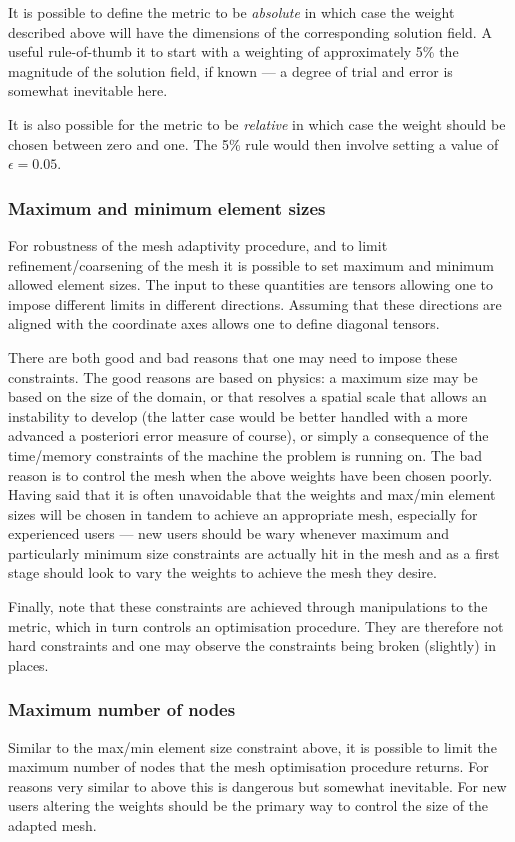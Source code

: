 It is possible to define the metric to be \emph{absolute} in which case the
weight described above will have the dimensions of the corresponding solution 
field. A useful rule-of-thumb it to start with a weighting of approximately 5\%
the magnitude of the solution field, if known --- a degree of trial and error
is somewhat inevitable here.

It is also possible for the metric to be \emph{relative} in which case the
weight should be chosen between zero and one. The 5\% rule would then involve
setting a value of $\epsilon=0.05$.

\subsubsection{Maximum and minimum element sizes}
For robustness of the mesh adaptivity procedure, and to limit refinement/coarsening of the
mesh it is possible to set maximum and minimum allowed element sizes. The input to
these quantities are tensors allowing one to impose different limits in different directions.
Assuming that these directions are aligned with the coordinate axes allows one to define
diagonal tensors.

There are both good and bad reasons that one may need to impose these constraints. The good
reasons are based on physics: a maximum size may be based on the size of the domain, or that
resolves a spatial scale that allows an instability to develop (the latter case would be better
handled with a more advanced a posteriori error measure of course), or simply a consequence of
the time/memory constraints of the machine the problem is running on. The bad reason is to control
the mesh when the above weights have been chosen poorly. Having said that it is often 
unavoidable that the weights and max/min element sizes will be chosen in tandem to achieve 
an appropriate mesh, especially for experienced users --- new users should be wary whenever maximum
and particularly minimum size constraints are actually hit in the mesh and as a first stage should
look to vary the weights to achieve the mesh they desire.

Finally, note that these constraints are achieved through manipulations to the metric, which in turn
controls an optimisation procedure. They are therefore not hard constraints and one may observe the
constraints being broken (slightly) in places.

\subsubsection{Maximum number of nodes}
Similar to the max/min element size constraint above, it is possible to limit the maximum number of nodes
that the mesh optimisation procedure returns. For reasons very similar to above this is dangerous
but somewhat inevitable. For new users altering the weights should be the primary way to control the
size of the adapted mesh.


